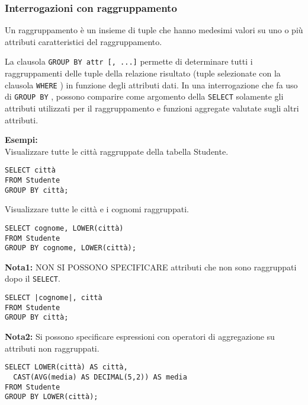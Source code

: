 \documentclass[a4paper, 10pt]{article}
\begin{document}
	\subsubsection{Interrogazioni con raggruppamento}
		Un raggruppamento è un insieme di tuple che hanno medesimi valori su
		uno o più attributi caratteristici del raggruppamento.
		
		\noindent
		La clausola \lstinline|GROUP BY attr [, ...]| permette di determinare tutti i
		raggruppamenti delle tuple della relazione risultato (tuple selezionate
		con la clausola \lstinline|WHERE| ) in funzione degli attributi dati.
		In una interrogazione che fa uso di \lstinline|GROUP BY| , possono comparire come
		argomento della \lstinline|SELECT| solamente gli attributi utilizzati per il
		raggruppamento e funzioni aggregate valutate sugli altri attributi.
		
		\noindent
		\textbf{Esempi: }\\		
		Visualizzare tutte le città raggruppate della tabella Studente.
		\begin{lstlisting}
SELECT città
FROM Studente
GROUP BY città;
		\end{lstlisting}
		Visualizzare tutte le città e i cognomi raggruppati.
		\begin{lstlisting}[mathescape]
SELECT cognome, LOWER(città)
FROM Studente
GROUP BY cognome, LOWER(città);
		\end{lstlisting}
		\textbf{Nota1: }NON SI POSSONO SPECIFICARE attributi che non sono raggruppati dopo il
		\lstinline|SELECT|.
		
		\begin{lstlisting}
SELECT |cognome|, città
FROM Studente
GROUP BY città;
		\end{lstlisting}
		
		\noindent
		\textbf{Nota2: }Si possono specificare espressioni con operatori di aggregazione su attributi
		non raggruppati.
		\begin{lstlisting}
SELECT LOWER(città) AS città,
  CAST(AVG(media) AS DECIMAL(5,2)) AS media
FROM Studente
GROUP BY LOWER(città);
		\end{lstlisting}
		
\end{document}
